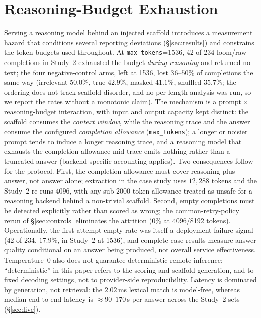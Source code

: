 \documentclass[10pt,twocolumn]{article}
\begin{document}
\section{Reasoning-Budget Exhaustion}\label{sec:practitioner}
Serving a reasoning model behind an injected scaffold introduces a measurement hazard that
conditions several reporting deviations (\S\ref{sec:results}) and constrains the token budgets used
throughout. At \texttt{max\_tokens}=1536, 42 of 234 loom/raw completions in Study~2 exhausted the
budget \emph{during reasoning} and returned no text; the four negative-control arms, left at 1536,
lost $36$--$50\%$ of completions the same way (irrelevant $50.0\%$, true $42.9\%$, masked $41.1\%$,
shuffled $35.7\%$; the ordering does not track scaffold disorder, and no per-length analysis was
run, so we report the rates without a monotonic claim). The mechanism is a
prompt\,$\times$\,reasoning-budget interaction, with input and output capacity kept distinct: the
scaffold consumes the \emph{context window}, while the reasoning trace and the answer consume the
configured \emph{completion allowance} (\texttt{max\_tokens}); a longer or noisier prompt tends to
induce a longer reasoning trace, and a reasoning model that exhausts the completion allowance
mid-trace emits nothing rather than a truncated answer (backend-specific accounting applies).
Two consequences follow for the protocol. First, the completion allowance must cover
reasoning-plus-answer, not answer alone; extraction in the case
study uses $12{,}288$ tokens and the Study~2 re-runs $4096$, with any sub-$2000$-token allowance
treated as unsafe for a reasoning backend behind a non-trivial scaffold. Second, empty completions
must be detected explicitly rather than scored as wrong; the common-retry-policy rerun of
\S\ref{sec:controls} eliminates the attrition ($0\%$ at 4096/8192 tokens). Operationally, the
first-attempt empty rate was itself a deployment failure signal ($42$ of $234$, $17.9\%$, in Study~2
at 1536), and complete-case results measure answer quality conditional on an answer being produced,
not overall service effectiveness. Temperature~0 also does not guarantee deterministic remote
inference; ``deterministic'' in this paper refers to the scoring and scaffold generation, and to
fixed decoding settings, not to provider-side reproducibility. Latency is dominated by
generation, not retrieval: the $2.02$\,ms lexical match is model-free, whereas median end-to-end
latency is $\approx90$--$170$\,s per answer across the Study~2 sets (\S\ref{sec:live}).
\end{document}
